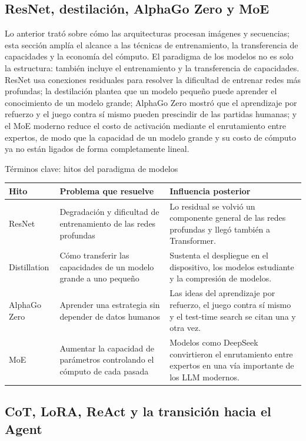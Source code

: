 \subsection{ResNet, destilación, AlphaGo Zero y MoE}

Lo anterior trató sobre cómo las arquitecturas procesan imágenes y secuencias; esta sección amplía el alcance a las técnicas de entrenamiento, la transferencia de capacidades y la economía del cómputo. El paradigma de los modelos no es solo la estructura: también incluye el entrenamiento y la transferencia de capacidades. ResNet usa conexiones residuales para resolver la dificultad de entrenar redes más profundas; la destilación plantea que un modelo pequeño puede aprender el conocimiento de un modelo grande; AlphaGo Zero mostró que el aprendizaje por refuerzo y el juego contra sí mismo pueden prescindir de las partidas humanas; y el MoE moderno reduce el costo de activación mediante el enrutamiento entre expertos, de modo que la capacidad de un modelo grande y su costo de cómputo ya no están ligados de forma completamente lineal.

\begin{knowledgebox}{Términos clave: hitos del paradigma de modelos}
\begin{tabularx}{\textwidth}{p{}p{}X}
\toprule
Hito & Problema que resuelve & Influencia posterior \\
\midrule
ResNet & Degradación y dificultad de entrenamiento de las redes profundas & Lo residual se volvió un componente general de las redes profundas y llegó también a Transformer. \\
Distillation & Cómo transferir las capacidades de un modelo grande a uno pequeño & Sustenta el despliegue en el dispositivo, los modelos estudiante y la compresión de modelos. \\
AlphaGo Zero & Aprender una estrategia sin depender de datos humanos & Las ideas del aprendizaje por refuerzo, el juego contra sí mismo y el test-time search se citan una y otra vez. \\
MoE & Aumentar la capacidad de parámetros controlando el cómputo de cada pasada & Modelos como DeepSeek convirtieron el enrutamiento entre expertos en una vía importante de los LLM modernos. \\
\bottomrule
\end{tabularx}
\end{knowledgebox}

\subsection{CoT, LoRA, ReAct y la transición hacia el Agent}

